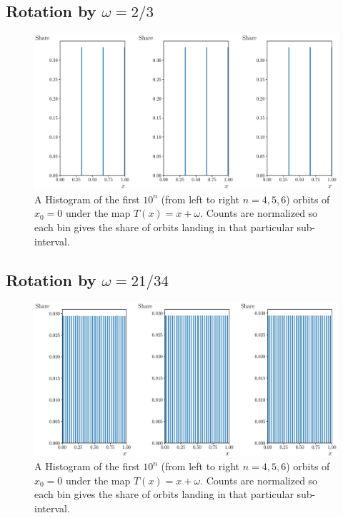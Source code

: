 \documentclass{article}
\begin{document}
\subsection*{Rotation by $\omega = 2/3$}

\begin{figure}[H]
	\centering
	\includegraphics[scale = 0.55]{Q100_Hist_Rot_23.eps}
	\caption{A Histogram of the first $10^n$ (from left to right $n = 4,5,6$) orbits of $x_0 = 0$ under the map $T(x) = x + \omega$. 
	Counts are normalized so each bin gives the share of orbits landing in that particular sub-interval.}
\end{figure}

\subsection*{Rotation by $\omega = 21/34$}

\begin{figure}[H]
	\centering
	\includegraphics[scale = 0.55]{Q100_Hist_Rot_34.eps}
	\caption{A Histogram of the first $10^n$ (from left to right $n = 4,5,6$) orbits of $x_0 = 0$ under the map $T(x) = x + \omega$. 
	Counts are normalized so each bin gives the share of orbits landing in that particular sub-interval.}
\end{figure}
\end{document}
